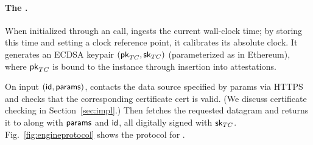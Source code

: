 \paragraph{The \encname \engine.} When initialized through an \initcall call, \engine ingests the current wall-clock time; by storing this time and setting a clock reference point, it calibrates its absolute clock. It generates an ECDSA keypair $({\sf pk}_{TC},{\sf sk}_{TC})$ (parameterized as in Ethereum), where ${\sf pk}_{TC}$ is bound to the \engine instance through insertion into attestations.  

On input \resumecall $({\sf id}, {\sf params})$, \engine contacts the data source specified by {\sf params} via HTTPS and checks that the corresponding certificate {\sf cert} is valid. (We discuss certificate checking in Section~\ref{sec:impl}.) Then \engine fetches the requested datagram and returns it to \relay along with ${\sf params}$ and ${\sf id}$, all digitally signed with ${\sf sk}_{TC}$.  Fig.~\ref{fig:engineprotocol} shows the protocol for \engine.

